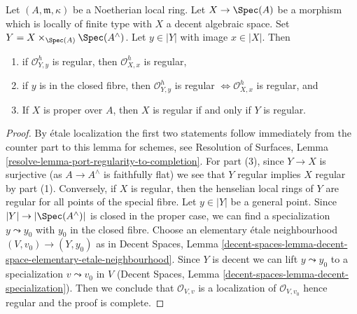 \begin{lemma}
\label{lemma-port-regularity-to-completion}
Let $(A, \mathfrak m, \kappa)$ be a Noetherian local ring.
Let $X \to \Spec(A)$ be a morphism which is locally of finite type
with $X$ a decent algebraic space. Set
$Y = X \times_{\Spec(A)} \Spec(A^\wedge)$. Let $y \in |Y|$
with image $x \in |X|$. Then
\begin{enumerate}
\item if $\mathcal{O}_{Y, y}^h$ is regular, then
$\mathcal{O}_{X, x}^h$ is regular,
\item if $y$ is in the closed fibre, then $\mathcal{O}_{Y, y}^h$ is regular
$\Leftrightarrow \mathcal{O}_{X, x}^h$ is regular, and
\item If $X$ is proper over $A$, then $X$ is regular
if and only if $Y$ is regular.
\end{enumerate}
\end{lemma}

\begin{proof}
By \'etale localization the first two statements follow
immediately from the counter part to this lemma for schemes, see
Resolution of Surfaces, Lemma \ref{resolve-lemma-port-regularity-to-completion}.
For part (3), since $Y \to X$ is surjective (as $A \to A^\wedge$
is faithfully flat) we see that $Y$ regular implies $X$ regular
by part (1). Conversely, if $X$ is regular, then the henselian
local rings of $Y$ are regular for all points of the special fibre.
Let $y \in |Y|$ be a general point.
Since $|Y| \to |\Spec(A^\wedge)|$ is closed in the proper
case, we can find a specialization $y \leadsto y_0$ with
$y_0$ in the closed fibre. Choose an elementary \'etale
neighbourhood $(V, v_0) \to (Y, y_0)$ as in
Decent Spaces, Lemma
\ref{decent-spaces-lemma-decent-space-elementary-etale-neighbourhood}.
Since $Y$ is decent we can lift $y \leadsto y_0$ to a specialization
$v \leadsto v_0$ in $V$
(Decent Spaces, Lemma \ref{decent-spaces-lemma-decent-specialization}).
Then we conclude that
$\mathcal{O}_{V, v}$ is a localization of $\mathcal{O}_{V, v_0}$
hence regular and the proof is complete.
\end{proof}
